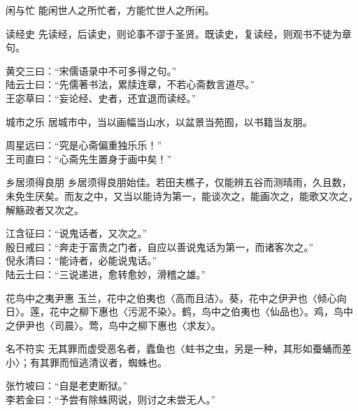 \begin{yulu}{闲与忙}
能闲世人之所忙者，方能忙世人之所闲。
\begin{comments}

\end{comments}
\end{yulu}

\begin{yulu}{读经史}
先读经，后读史，则论事不谬于圣贤。既读史，复读经，则观书不徒为章句。
\begin{comments}
黄交三曰：“宋儒语录中不可多得之句。” \\
陆云士曰：“先儒著书法，累牍连章，不若心斋数言道尽。” \\
王宓草曰：“妄论经、史者，还宜退而读经。”
\end{comments}
\end{yulu}

\begin{yulu}{城市之乐}
居城市中，当以画幅当山水，以盆景当苑囿，以书籍当友朋。
\begin{comments}
周星远曰：“究是心斋偏重独乐乐！” \\
王司直曰：“心斋先生置身于画中矣！”
\end{comments}
\end{yulu}

\begin{yulu}{乡居须得良朋}
乡居须得良朋始佳。若田夫樵子，仅能辨五谷而测晴雨，久且数，未免生厌矣。而友之中，又当以能诗为第一，能谈次之，能画次之，能歌又次之，解觞政者又次之。
\begin{comments}
江含征曰：“说鬼话者，又次之。” \\
殷日戒曰：“奔走于富贵之门者，自应以善说鬼话为第一，而诸客次之。” \\
倪永清曰：“能诗者，必能说鬼话。” \\
陆云士曰：“三说递进，愈转愈妙，滑稽之雄。”
\end{comments}
\end{yulu}

\begin{yulu}{花鸟中之夷尹惠}
玉兰，花中之伯夷也〈高而且洁〉。葵，花中之伊尹也〈倾心向日〉。莲，花中之柳下惠也〈污泥不染〉。鹤，鸟中之伯夷也〈仙品也〉。鸡，鸟中之伊尹也〈司晨〉。莺，鸟中之柳下惠也〈求友〉。
\begin{comments}

\end{comments}
\end{yulu}

\begin{yulu}{名不符实}
无其罪而虚受恶名者，蠹鱼也〈蛀书之虫，另是一种，其形如蚕蛹而差小〉；有其罪而恒逃清议者，蜘蛛也。
\begin{comments}
张竹坡曰：“自是老吏断狱。” \\
李若金曰：“予尝有除蛛网说，则讨之未尝无人。”
\end{comments}
\end{yulu}

